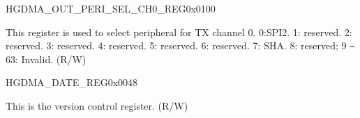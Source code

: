 \begin{register}{H}{GDMA\_OUT\_PERI\_SEL\_CH0\_REG}{0x0100}\label{regdesc:GDMAOUTPERISELCH0REG}
%
%
\regnewline%
\begin{regdesc}\begin{reglist}
\label{fielddesc:GDMAPERIOUTSELCH0}\item [GDMA\_PERI\_OUT\_SEL\_CH0] This register is used to select peripheral for TX channel 0. 0:SPI2. 1: reserved. 2: reserved. 3: reserved. 4: reserved. 5: reserved. 6: reserved. 7: SHA. 8: reserved; 9 \verb+~+ 63: Invalid. (R/W)
\end{reglist}\end{regdesc}
\end{register}

\begin{register}{H}{GDMA\_DATE\_REG}{0x0048}\label{regdesc:GDMADATEREG}
%
\regnewline%
\begin{regdesc}\begin{reglist}
\label{fielddesc:GDMADATE}\item [GDMA\_DATE] This is the version control register. (R/W)
\end{reglist}\end{regdesc}
\end{register}


